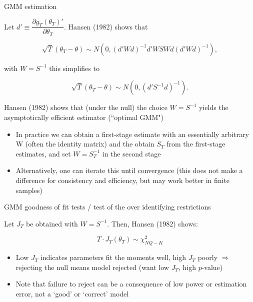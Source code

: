 \documentclass[xcolor=table, aspectratio=169]{beamer}
\begin{document}
\begin{frame}{GMM estimation}

Let $d' \equiv  \dfrac{\partial g_T(\theta_T)'}{\partial \theta_T}.$ Hansen (1982) shows that

$$\sqrt{T} (\theta_T - \theta) \sim N\left(0, (d'Wd)^{-1}d'WSWd (d'Wd)^{-1}\right),$$

with $W = S^{-1}$ this simplifies to

$$\sqrt{T} (\theta_T - \theta) \sim N\left(0, (d'S^{-1}d)^{-1}\right).$$

Hansen (1982) shows that (under the null) the choice $W = S^{-1}$ yields the asymptotically efficient estimator (``optimal GMM")

\begin{itemize}
\item In practice we can obtain a first-stage estimate with an essentially arbitrary W (often the identity matrix) and the obtain $S_T$ from the first-stage estimates, and set $W = S_T^{-1}$ in the second stage

\item Alternatively, one can iterate this until convergence (this does not make a difference for consistency and efficiency, but may work better in finite samples)

\end{itemize}
\end{frame}


\begin{frame}{GMM goodness of fit tests / test of the over identifying restrictions}

Let $J_T$ be obtained with $W = S^{-1}$. Then, Hansen (1982) shows: 

$$T \cdot J_T(\theta_T) \sim \chi^2_{NQ-K}$$

\begin{itemize}
\item Low $J_T$ indicates parameters fit the moments well, high $J_T$ poorly $\Rightarrow$ rejecting the null means model rejected (want low $J_T$, high $p$-value)
\item Note that failure to reject can be a consequence of low power or estimation error, not a `good' or `correct' model
\end{itemize}

\end{frame}
\end{document}
